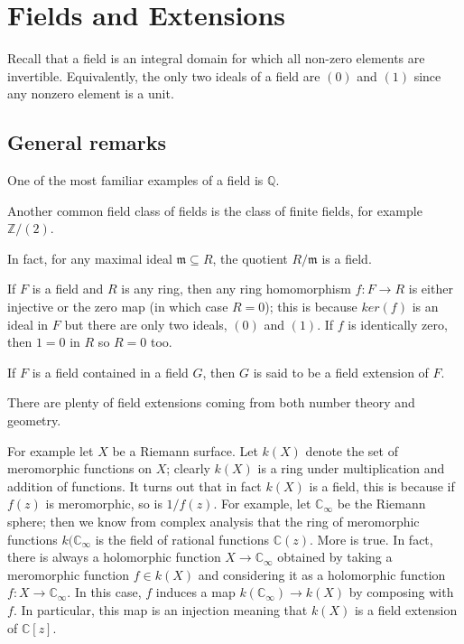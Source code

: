 \chapter{Fields and Extensions}
Recall that a field is an integral domain for which all non-zero elements are
invertible. Equivalently, the only two ideals of a field are $(0)$ and $(1)$
since any nonzero element is a unit.

\section{General remarks}

\begin{example}
One of the most familiar examples of a field is $\mathbb{Q}$.
\end{example}

\begin{example}
Another common field class of fields is the class of finite fields, for example
$\mathbb{Z}/(2)$.
\end{example}

\begin{exercise} In fact, for any maximal ideal $\mathfrak{m}\subseteq R$, the
quotient $R/\mathfrak{m}$ is a field. 
\end{exercise}

\begin{example} If $F$ is a field and $R$ is any ring, then any ring homomorphism $f:F\rightarrow
R$ is either injective or the zero map (in which case $R=0$); this is because $ker(f)$ is an ideal in
$F$ but there are only two ideals, $(0)$ and $(1)$. If $f$ is identically
zero, then $1=0$ in $R$ so $R=0$ too.
\end{example}

\begin{definition} If $F$ is a field contained in a field $G$, then $G$ is said
to be a field extension of $F$.
\end{definition}

There are plenty of field extensions coming from both number theory and
geometry.

\begin{example} For example let $X$ be a Riemann surface. Let $k(X)$ denote the
set of meromorphic functions on $X$; clearly $k(X)$ is a ring under
multiplication and addition of functions. It turns out that in fact $k(X)$ is a
field, this is because if $f(z)$ is meromorphic, so is $1/f(z)$. For example,
let $\mathbb{C}_{\infty}$ be the Riemann sphere; then we know from complex
analysis that the ring of meromorphic functions $k(\mathbb{C}_{\infty}$ is the
field of rational functions $\mathbb{C}(z)$. More is true. In fact, there is
always a holomorphic function $X\rightarrow \mathbb{C}_{\infty}$ obtained by
taking a meromorphic function $f\in k(X)$ and considering it as a holomorphic
function $f:X\rightarrow\mathbb{C}_{\infty}$. In this case, $f$ induces a map
$k(\mathbb{C}_{\infty})\rightarrow k(X)$ by composing with $f$. In particular,
this map is an injection meaning that $k(X)$ is a field extension of
$\mathbb{C}[z]$.
\end{example}

